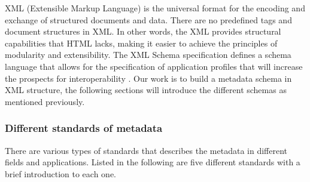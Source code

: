 XML (Extensible Markup Language) is the universal format for the encoding and exchange of structured documents and data. There are no predefined tags and document structures in XML. In other words, the XML provides structural capabilities that HTML lacks, making it easier to achieve the principles of modularity and extensibility. The XML Schema specification defines a schema language that allows for the specification of application profiles that will increase the prospects for interoperability \cite{duval2002metadata}. Our work is to build a metadata schema in XML structure, the following sections will introduce the different schemas as mentioned previously.


\subsubsection*{Different standards of metadata}
\label{sec:mets}
There are various types of standards that describes the metadata in different fields and applications. Listed in the following are five different standards with a brief introduction to each one.

